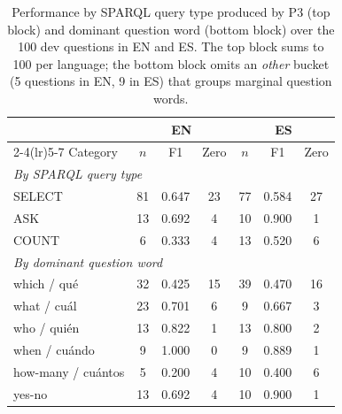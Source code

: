 \documentclass[]{ceurart}
\begin{document}
\begin{table}[h]
\centering
\caption{Performance by SPARQL query type produced by P3 (top block) and dominant question word (bottom block) over the 100 dev questions in EN and ES. The top block sums to 100 per language; the bottom block omits an \emph{other} bucket (5 questions in EN, 9 in ES) that groups marginal question words.}
\label{tab:bytypeinterr}
\begin{tabular}{lcccccc}
\toprule
 & \multicolumn{3}{c}{EN} & \multicolumn{3}{c}{ES} \\
\cmidrule(lr){2-4}\cmidrule(lr){5-7}
Category & $n$ & F1 & Zero & $n$ & F1 & Zero \\
\midrule
\multicolumn{7}{l}{\emph{By SPARQL query type}} \\
SELECT   & 81 & 0.647 & 23 & 77 & 0.584 & 27 \\
ASK      & 13 & 0.692 &  4 & 10 & 0.900 &  1 \\
COUNT    &  6 & 0.333 &  4 & 13 & 0.520 &  6 \\
\midrule
\multicolumn{7}{l}{\emph{By dominant question word}} \\
which / qu\'e         & 32 & 0.425 & 15 & 39 & 0.470 & 16 \\
what / cu\'al         & 23 & 0.701 &  6 &  9 & 0.667 &  3 \\
who / qui\'en         & 13 & 0.822 &  1 & 13 & 0.800 &  2 \\
when / cu\'ando       &  9 & 1.000 &  0 &  9 & 0.889 &  1 \\
how-many / cu\'antos  &  5 & 0.200 &  4 & 10 & 0.400 &  6 \\
yes-no                & 13 & 0.692 &  4 & 10 & 0.900 &  1 \\
\bottomrule
\end{tabular}
\end{table}

\end{document}
